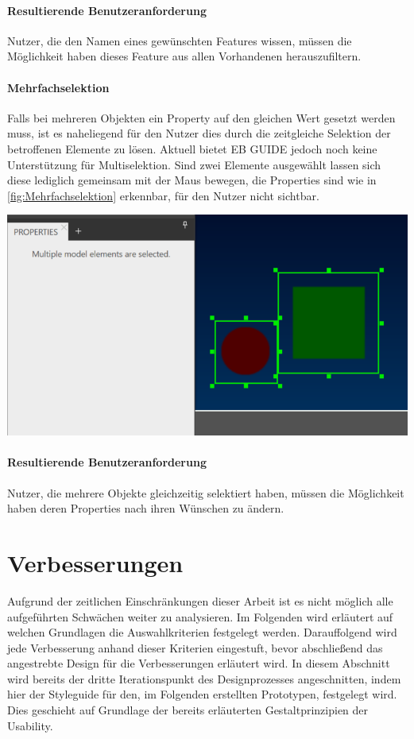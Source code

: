 \paragraph{Resultierende Benutzeranforderung}
Nutzer, die den Namen eines gewünschten Features wissen, müssen die Möglichkeit haben dieses Feature aus allen Vorhandenen herauszufiltern.

\paragraph{Mehrfachselektion}
Falls bei mehreren Objekten ein Property auf den gleichen Wert gesetzt werden muss, ist es naheliegend für den Nutzer dies durch die zeitgleiche Selektion der betroffenen Elemente zu lösen.
Aktuell bietet EB GUIDE jedoch noch keine Unterstützung für Multiselektion.
Sind zwei Elemente ausgewählt lassen sich diese lediglich gemeinsam mit der Maus bewegen, die Properties sind wie in \cref{fig:Mehrfachselektion} erkennbar, für den Nutzer nicht sichtbar.

\begin{center}
  \includegraphics[scale=0.8]{figures/Mehrfachselektion.png}
  \label{fig:Mehrfachselektion}
\end{center}

\paragraph{Resultierende Benutzeranforderung}
Nutzer, die mehrere Objekte gleichzeitig selektiert haben, müssen die Möglichkeit haben deren Properties nach ihren Wünschen zu ändern.

\section{Verbesserungen}
Aufgrund der zeitlichen Einschränkungen dieser Arbeit ist es nicht möglich alle aufgeführten Schwächen weiter zu analysieren. 
Im Folgenden wird erläutert auf welchen Grundlagen die Auswahlkriterien festgelegt werden.
Darauffolgend wird jede Verbesserung anhand dieser Kriterien eingestuft, bevor abschließend das angestrebte Design für die Verbesserungen erläutert wird.
In diesem Abschnitt wird bereits der dritte Iterationspunkt des Designprozesses angeschnitten, indem hier der Styleguide für den, im Folgenden erstellten Prototypen, festgelegt wird. Dies geschieht auf Grundlage der bereits erläuterten Gestaltprinzipien der Usability.

